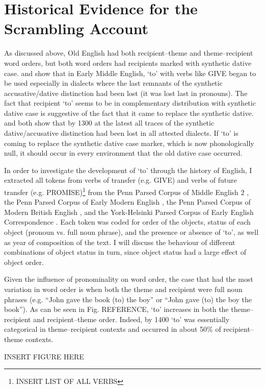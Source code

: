 \documentclass[11pt]{upenndiss}
\begin{document}
\chapter{Historical Evidence for the Scrambling Account}
As discussed above, Old English had both recipient--theme and theme--recipient word orders, but both word orders had recipients marked with synthetic dative case.  \cite{Polo.2002} and \cite{McFadden.2002} show that in Early Middle English, `to' with verbs like GIVE began to be used especially in dialects where the last remnants of the synthetic accusative/dative distinction had been lost (it was lost last in pronouns). The fact that recipient `to' seems to be in complementary distribution with synthetic dative case is suggestive of the fact that it came to replace the synthetic dative. \cite{Allen.1999} and \cite{McFadden.2002} both show that by 1300 at the latest all traces of the synthetic dative/accusative distinction had been lost in all attested dialects. If `to' is coming to replace the synthetic dative case marker, which is now phonologically null, it should occur in every environment that the old dative case occurred.

In order to investigate the development of `to' through the history of English, I extracted all tokens from verbs of transfer (e.g. GIVE) and verbs of future transfer (e.g. PROMISE)\footnote{INSERT LIST OF ALL VERBS} from the Penn Parsed Corpus of Middle English 2 \citep{Kroch.2000}, the Penn Parsed Corpus of Early Modern English \cite{Krochp.2004}, the Penn Parsed Corpus of Modern British English \citep{Kroch.2010}, and the York-Helsinki Parsed Corpus of Early English Correspondence \citep{Taylor.2006}. Each token was coded for order of the objects, status of each object (pronoun vs. full noun phrase), and the presence or absence of `to', as well as year of composition of the text. I will discuss the behaviour of different combinations of object status in turn, since object status had a large effect of object order.

Given the influence of pronominality on word order, the case that had the most variation in word order is when both the theme and recipient were full noun phrases (e.g. ``John gave the book (to) the boy'' or ``John gave (to) the boy the book''). As can be seen in Fig. REFERENCE, `to' increases in both the theme--recipient and recipient--theme order. Indeed, by 1400 `to' was essentially categorical in theme--recipient contexts and occurred in about 50\% of recipient--theme contexts.

INSERT FIGURE HERE
\end{document}
